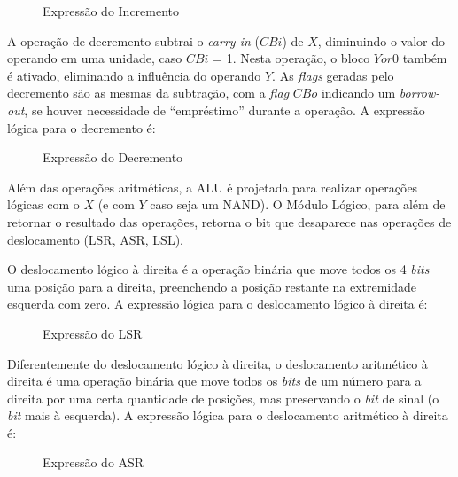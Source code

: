 \begin{figure}[H]
    \centering
    \caption{Expressão do Incremento}
\end{figure}


A operação de decremento subtrai o \textit{carry-in} ($CBi$) de $X$, diminuindo o valor do operando em uma unidade, caso $CBi$ = 1. Nesta operação, o bloco $Yor0$ também é ativado, eliminando a influência do operando $Y$. As \textit{flags} geradas pelo decremento são as mesmas da subtração, com a \textit{flag} $CBo$ indicando um \textit{borrow-out}, se houver necessidade de “empréstimo” durante a operação. A expressão lógica para o decremento é:

\begin{figure}[H]
    \centering
    \caption{Expressão do Decremento}
\end{figure}


Além das operações aritméticas, a ALU é projetada para realizar operações lógicas com o $X$ (e com $Y$ caso seja um NAND). O Módulo Lógico, para além de retornar o resultado das operações, retorna o bit que desaparece nas operações de deslocamento (LSR, ASR, LSL).


O deslocamento lógico à direita é a operação binária que move todos os 4 \textit{bits} uma posição para a direita, preenchendo a posição restante na extremidade esquerda com zero. A expressão lógica para o deslocamento lógico à direita é:

\begin{figure}[H]
    \centering
    \caption{Expressão do LSR}
\end{figure}


Diferentemente do deslocamento lógico à direita, o deslocamento aritmético à direita é uma operação binária que move todos os \textit{bits} de um número para a direita por uma certa quantidade de posições, mas preservando o \textit{bit} de sinal (o \textit{bit} mais à esquerda). A expressão lógica para o deslocamento aritmético à direita é:

\begin{figure}[H]
    \centering
    \caption{Expressão do ASR}
\end{figure}

